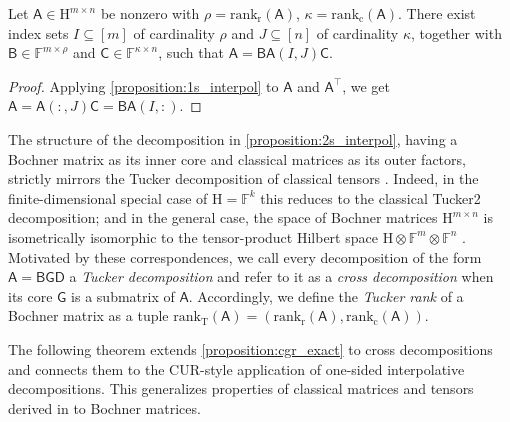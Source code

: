 \documentclass[onefignum,onetabnum]{siamart250211}
\newcommand{\F}{\mathbb{F}}
\newcommand{\Hilb}{\mathrm{H}}
\newcommand{\Batrix}[1]{\bm{\Matrix{#1}}}
\newcommand{\Matrix}[1]{\mathsf{#1}}
\newcommand{\trans}{\intercal}
\newcommand{\krp}{\mathbin{\otimes}}
\newcommand{\Rank}[3][]{\mathrm{rank_{#2}} #1( #3 #1)}
\newcommand{\Index}[1]{{#1}}
\begin{document}
\begin{proposition}
\label{proposition:2s_interpol}
Let $\Batrix{A} \in \Hilb^{m \times n}$ be nonzero with $\rho = \Rank{r}{\Batrix{A}}$, $\kappa = \Rank{c}{\Batrix{A}}$.
There exist index sets $\Index{I} \subseteq [m]$ of cardinality $\rho$ and $\Index{J} \subseteq [n]$ of cardinality $\kappa$, together with $\Matrix{B} \in \F^{m \times \rho}$ and $\Matrix{C} \in \F^{\kappa \times n}$, such that $\Batrix{A} = \Matrix{B} \Batrix{A}(\Index{I}, \Index{J}) \Matrix{C}$.
\end{proposition}
\begin{proof}
Applying \cref{proposition:1s_interpol} to $\Batrix{A}$ and $\Batrix{A}^\trans$, we get $\Batrix{A} = \Batrix{A}(:, \Index{J}) \Matrix{C} = \Matrix{B} \Batrix{A}(\Index{I}, :)$.
\end{proof}

The structure of the decomposition in \cref{proposition:2s_interpol}, having a Bochner matrix as its inner core and classical matrices as its outer factors, strictly mirrors the Tucker decomposition of classical tensors \cite{ballard2025tensor}.
Indeed, in the finite-dimensional special case of $\Hilb = \F^{k}$ this reduces to the classical Tucker2 decomposition; and in the general case, the space of Bochner matrices $\Hilb^{m \times n}$ is isometrically isomorphic to the tensor-product Hilbert space $\Hilb \krp \F^{m} \krp \F^{n}$ \cite{hackbusch2019tensor}.
Motivated by these correspondences, we call every decomposition of the form $\Batrix{A} = \Matrix{B} \Batrix{G} \Matrix{D}$ a \emph{Tucker decomposition} and refer to it as a \emph{cross decomposition} when its core $\Batrix{G}$ is a submatrix of $\Batrix{A}$.
Accordingly, we define the \emph{Tucker rank} of a Bochner matrix as a tuple $\Rank{T}{\Batrix{A}} = (\Rank{r}{\Batrix{A}}, \Rank{c}{\Batrix{A}})$.

The following theorem extends \cref{proposition:cgr_exact} to cross decompositions and connects them to the CUR-style application of one-sided interpolative decompositions.
This generalizes properties of classical matrices and tensors derived in \cite{caiafa2010generalizing, hamm2020perspectives, cai2021mode} to Bochner matrices.
\end{document}
